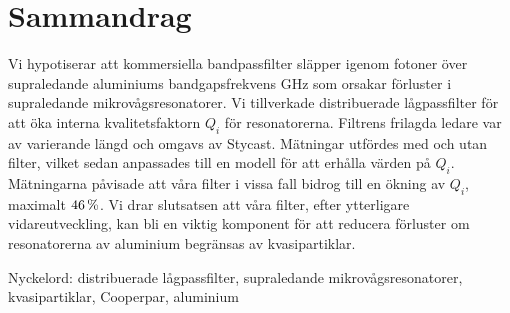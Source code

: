 \documentclass[../../main.tex]{subfiles}
\begin{document}
\section*{Sammandrag}
Vi hypotiserar att kommersiella bandpassfilter släpper igenom fotoner över supraledande aluminiums bandgapsfrekvens \unit[88]{GHz} som orsakar förluster i supraledande mikrovågsresonatorer. Vi tillverkade distribuerade lågpassfilter för att öka interna kvalitetsfaktorn $Q_i$ för resonatorerna. Filtrens frilagda ledare var av varierande längd och omgavs av Stycast. Mätningar utfördes med och utan filter, vilket sedan anpassades till en modell för att erhålla värden på $Q_i$. Mätningarna påvisade att våra filter i vissa fall bidrog till en ökning av $Q_i$, maximalt  $\unit[46]{\%}$. Vi drar slutsatsen att våra filter, efter ytterligare vidareutveckling, kan bli en viktig komponent för att reducera förluster om resonatorerna av aluminium begränsas av kvasipartiklar.

\vfill
Nyckelord: distribuerade lågpassfilter, supraledande mikrovågsresonatorer, kvasipartiklar, Cooperpar, aluminium

\newpage\null\thispagestyle{empty}\newpage
\end{document}
